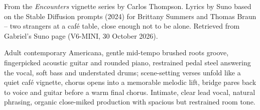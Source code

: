 
\label{sec:a-quiet-kindness}
\begin{notes}
From the \emph{Encounters} vignette series by Carlos Thompson. Lyrics by Suno based on the Stable Diffusion prompts (2024) for Brittany Summers and Thomas Braun -- two strangers at a café table, close enough not to be alone. Retrieved from Gabriel's Suno page (V6-MINI, 30 October 2026).
\end{notes}
\begin{style}
Adult contemporary Americana, gentle mid-tempo brushed roots groove, fingerpicked acoustic guitar and rounded piano, restrained pedal steel answering the vocal, soft bass and understated drums; scene-setting verses unfold like a quiet café vignette, chorus opens into a memorable melodic lift, bridge pares back to voice and guitar before a warm final chorus. Intimate, clear lead vocal, natural phrasing, organic close-miked production with spacious but restrained room tone.
\end{style}
